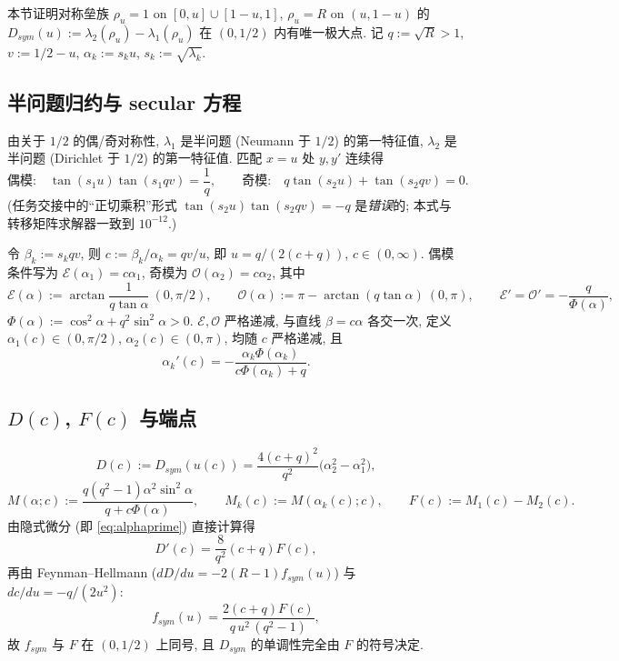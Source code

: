 \documentclass[UTF8]{ctexart}
\begin{document}
本节证明对称垒族 $\rho_u=1$ on $[0,u]\cup[1-u,1]$, $\rho_u=R$ on $(u,1-u)$ 的
$D_{sym}(u):=\lambda_2(\rho_u)-\lambda_1(\rho_u)$ 在 $(0,1/2)$ 内有唯一极大点.
记 $q:=\sqrt R>1$, $v:=1/2-u$, $\alpha_k:=s_k u$, $s_k:=\sqrt{\lambda_k}$.

\subsection{半问题归约与 secular 方程}
由关于 $1/2$ 的偶/奇对称性, $\lambda_1$ 是半问题 (Neumann 于 $1/2$) 的第一特征值,
$\lambda_2$ 是半问题 (Dirichlet 于 $1/2$) 的第一特征值. 匹配 $x=u$ 处 $y,y'$ 连续得
\begin{equation}
	\text{偶模:}\quad \tan(s_1u)\tan(s_1qv)=\frac1q,\qquad
	\text{奇模:}\quad q\tan(s_2u)+\tan(s_2qv)=0.
\end{equation}
(任务交接中的``正切乘积''形式 $\tan(s_2u)\tan(s_2qv)=-q$ 是\emph{错误}的; 本式与
转移矩阵求解器一致到 $10^{-12}$.)

令 $\beta_k:=s_k qv$, 则 $c:=\beta_k/\alpha_k=qv/u$, 即 $u=q/(2(c+q))$, $c\in(0,\infty)$.
偶模条件写为 $\mathcal E(\alpha_1)=c\alpha_1$, 奇模为 $\mathcal O(\alpha_2)=c\alpha_2$, 其中
\begin{equation}
	\mathcal E(\alpha):=\arctan\frac1{q\tan\alpha}\ (0,\pi/2),\qquad
	\mathcal O(\alpha):=\pi-\arctan(q\tan\alpha)\ (0,\pi),\qquad
	\mathcal E'=\mathcal O'=-\frac{q}{\Phi(\alpha)},
\end{equation}
$\Phi(\alpha):=\cos^2\alpha+q^2\sin^2\alpha>0$. $\mathcal E,\mathcal O$ 严格递减, 与直线
$\beta=c\alpha$ 各交一次, 定义 $\alpha_1(c)\in(0,\pi/2)$, $\alpha_2(c)\in(0,\pi)$, 均随
$c$ 严格递减, 且
\begin{equation}
	\alpha_k'(c)=-\frac{\alpha_k\Phi(\alpha_k)}{c\Phi(\alpha_k)+q}.
	\label{eq:alphaprime}
\end{equation}

\subsection{\texorpdfstring{$D(c)$, $F(c)$}{D(c), F(c)} 与端点}
\begin{equation}
	D(c):=D_{sym}(u(c))=\frac{4(c+q)^2}{q^2}\bigl(\alpha_2^2-\alpha_1^2\bigr),
\end{equation}
\begin{equation}
	M(\alpha;c):=\frac{q(q^2-1)\alpha^2\sin^2\alpha}{q+c\Phi(\alpha)},\qquad
	M_k(c):=M(\alpha_k(c);c),\qquad F(c):=M_1(c)-M_2(c).
\end{equation}
由隐式微分 (即 \eqref{eq:alphaprime}) 直接计算得
\begin{equation}
	D'(c)=\frac{8}{q^2}(c+q)F(c),
\end{equation}
再由 Feynman--Hellmann ($dD/du=-2(R-1)f_{sym}(u)$) 与 $dc/du=-q/(2u^2)$:
\begin{equation}
	f_{sym}(u)=\frac{2(c+q)F(c)}{q\,u^2\,(q^2-1)},
\end{equation}
故 $f_{sym}$ 与 $F$ 在 $(0,1/2)$ 上同号, 且 $D_{sym}$ 的单调性完全由 $F$ 的符号决定.
\end{document}
